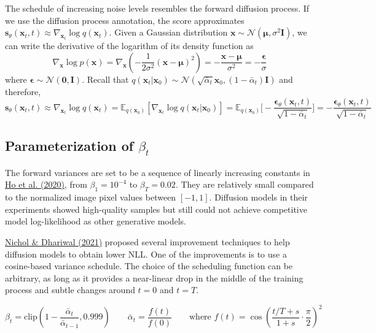 \documentclass[12pt]{article}
\begin{document}
The schedule of increasing noise levels resembles the forward diffusion process. If we use the diffusion process annotation, the score approximates $\mathbf{s}_\theta(\mathbf{x}_t, t) \approx \nabla_{\mathbf{x}_t} \log q(\mathbf{x}_t)$. Given a Gaussian distribution $\mathbf{x} \sim \mathcal{N}(\boldsymbol{\mu}, \sigma^2 \mathbf{I})$, we can write the derivative of the logarithm of its density function as
\[
\nabla_{\mathbf{x}}\log p(\mathbf{x}) = \nabla_{\mathbf{x}} \left(-\frac{1}{2\sigma^2}(\mathbf{x} - \boldsymbol{\mu})^2 \right) = - \frac{\mathbf{x} - \boldsymbol{\mu}}{\sigma^2} = - \frac{\boldsymbol{\epsilon}}{\sigma}
\]
where $\boldsymbol{\epsilon} \sim \mathcal{N}(\boldsymbol{0}, \mathbf{I})$. Recall that $q(\mathbf{x}_t \vert \mathbf{x}_0) \sim \mathcal{N}(\sqrt{\bar{\alpha}_t} \mathbf{x}_0, (1 - \bar{\alpha}_t)\mathbf{I})$ and therefore,
\[
\mathbf{s}_\theta(\mathbf{x}_t, t) 
\approx \nabla_{\mathbf{x}_t} \log q(\mathbf{x}_t)
= \mathbb{E}_{q(\mathbf{x}_0)} [\nabla_{\mathbf{x}_t} \log q(\mathbf{x}_t \vert \mathbf{x}_0)]
= \mathbb{E}_{q(\mathbf{x}_0)} \Big[ - \frac{\boldsymbol{\epsilon}_\theta(\mathbf{x}_t, t)}{\sqrt{1 - \bar{\alpha}_t}} \Big]
= - \frac{\boldsymbol{\epsilon}_\theta(\mathbf{x}_t, t)}{\sqrt{1 - \bar{\alpha}_t}}
\]

\subsection{Parameterization of $\beta_t$}
The forward variances are set to be a sequence of linearly increasing constants in \href{https://arxiv.org/abs/2006.11239}{Ho et al. (2020)}, from $\beta_1=10^{-4}$ to $\beta_T=0.02$. They are relatively small compared to the normalized image pixel values between $[-1, 1]$. Diffusion models in their experiments showed high-quality samples but still could not achieve competitive model log-likelihood as other generative models.

\href{https://arxiv.org/abs/2102.09672}{Nichol \& Dhariwal (2021)} proposed several improvement techniques to help diffusion models to obtain lower NLL. One of the improvements is to use a cosine-based variance schedule. The choice of the scheduling function can be arbitrary, as long as it provides a near-linear drop in the middle of the training process and subtle changes around $t=0$ and $t=T$.

\[
\beta_t = \text{clip}\left(1-\frac{\bar{\alpha}_t}{\bar{\alpha}_{t-1}}, 0.999\right) \qquad \bar{\alpha}_t = \frac{f(t)}{f(0)} \qquad \text{where } f(t)=\cos\left(\frac{t/T+s}{1+s}\cdot\frac{\pi}{2}\right)^2
\]
\end{document}
